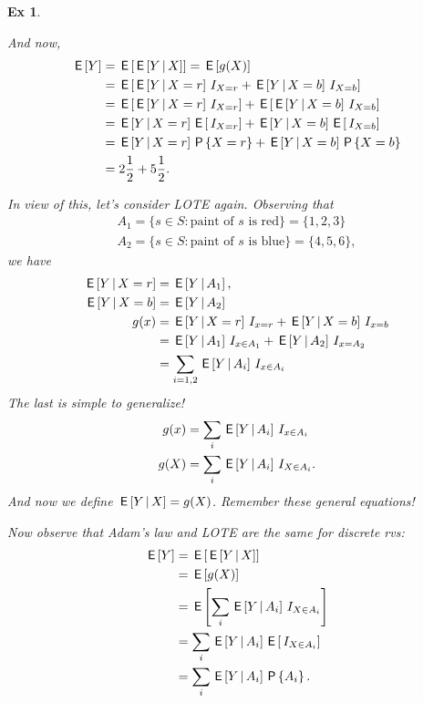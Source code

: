 \documentclass[a4paper,11pt]{article}
\newtheorem{exercise}[theorem]{Ex}
\begin{document}
\begin{exercise}
\begin{solution}
And now,
\begin{align}
\E Y &= \E{\E{Y\given X}} = \E{g(X)} \\
&=\E{\E{Y\given X=r} \1{X=r} + \E{Y\given X=b} \1{X=b}}\\
&=\E{\E{Y\given X=r} \1{X=r}} + \E{\E{Y\given X=b} \1{X=b}}\\
&=\E{Y\given X=r} \E{\1{X=r}} + \E{Y\given X=b} \E{\1{X=b}}\\
&=\E{Y\given X=r} \P{X=r} + \E{Y\given X=b} \P{X=b}\\
&=2 \frac{1}{2}+ 5 \frac{1}{2}.
\end{align}

In view of this, let's consider LOTE again. Observing that
\begin{align}
A_{1} = \{s \in S : \textrm{paint of $s$ is red}\} = \{1, 2,3 \} \\
A_{2} = \{s \in S : \textrm{paint of $s$ is blue}\} = \{4, 5, 6\},
\end{align}
we have
\begin{align}
  \E{Y\given X=r} &= \E{Y\given A_{1}}, \\
  \E{Y\given X=b} &= \E{Y\given A_{2}} \\
  g(x) &= \E{Y\given X=r} \1{x=r} + \E{Y\given X=b} \1{x=b} \\
   &= \E{Y\given A_{1}} \1{x\in A_{1}} + \E{Y\given A_{2}} \1{x=A_{2}} \\
 &= \sum_{i=1,2}  \E{Y\given A_{i}} \1{x\in A_{i}}
\end{align}
The last is simple to generalize!
\begin{align}
  g(x)  &= \sum_{i}  \E{Y\given A_{i}} \1{x\in A_{i}}  \\
  g(X)  &= \sum_{i}  \E{Y\given A_{i}} \1{X\in A_{i}}.
\end{align}
And now we define $\E{Y\given X} = g(X)$. Remember these general equations!


Now observe that Adam's law and LOTE are the same for discrete rvs:
\begin{align*}
\E{Y}
&= \E{\E{Y\given X}} \\
&= \E{g(X)} \\
&=\E{\sum_{i} \E{Y\given A_{i}} \1{X\in A_{i}}} \\
&=\sum_{i}  \E{Y\given A_{i}} \E{\1{X\in A_{i}}} \\
&=\sum_{i}  \E{Y\given A_{i}} \P{A_{i}}.
\end{align*}
\end{solution}
\end{exercise}
\end{document}
